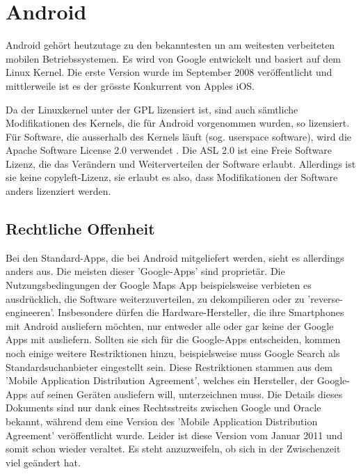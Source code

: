 \section{Android}

Android gehört heutzutage zu den bekanntesten un am weitesten verbeiteten mobilen Betriebssystemen. Es wird von Google entwickelt und basiert auf dem Linux Kernel. Die erste Version wurde im September 2008 veröffentlicht und mittlerweile ist es der grösste Konkurrent von Apples iOS. 

Da der Linuxkernel unter der GPL lizensiert ist, sind auch sämtliche Modifikationen des Kernels, die für Android vorgenommen wurden, so lizensiert. Für Software, die ausserhalb des Kernels läuft (sog. userspace software), wird die Apache Software License 2.0 verwendet \cite{online:android-licenses}. Die ASL 2.0 ist eine Freie Software Lizenz, die das Verändern und Weiterverteilen der Software erlaubt. Allerdings ist sie  keine copyleft-Lizenz, sie erlaubt es also, dass Modifikationen der Software anders lizenziert werden\cite{online:apache-license}.

\subsection{Rechtliche Offenheit}
Bei den Standard-Apps, die bei Android mitgeliefert werden, sieht es allerdings anders aus. Die meisten dieser 'Google-Apps' sind proprietär. Die Nutzungsbedingungen der Google Maps App beispielsweise verbieten es ausdrücklich, die Software weiterzuverteilen, zu dekompilieren oder zu 'reverse-engineeren'\cite{online:google-maps-tos}. Insbesondere dürfen die Hardware-Hersteller, die ihre Smartphones mit Android ausliefern möchten, nur entweder alle oder gar keine der Google Apps mit ausliefern. Sollten sie sich für die Google-Apps entscheiden, kommen noch einige weitere Restriktionen hinzu, beispielsweise muss Google Search als Standardsuchanbieter eingestellt sein\cite{online:mada-leak}.
Diese Restriktionen stammen aus dem 'Mobile Application Distribution Agreement', welches ein Hersteller, der Google-Apps auf seinen Geräten ausliefern will, unterzeichnen muss. Die Details dieses Dokuments sind nur dank eines Rechtsstreits zwischen Google und Oracle bekannt, während dem eine Version des 'Mobile Application Distribution Agreement' veröffentlicht wurde\cite{online:ars-mada-leak}. Leider ist diese Version vom Januar 2011 und somit schon wieder veraltet. Es steht anzuzweifeln, ob sich in der Zwischenzeit viel geändert hat. 

